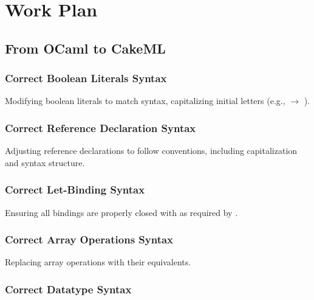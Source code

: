 
%

\chapter{Work Plan}
\label{cha:Work_Plan}

\section{From OCaml to CakeML}

\subsection{Correct Boolean Literals Syntax}

Modifying boolean literals to match \cml syntax, capitalizing initial letters (e.g.,  
$\rightarrow$ ).

\subsection{Correct Reference Declaration Syntax}

Adjusting reference declarations to follow \cml conventions, including capitalization and syntax structure.

\subsection{Correct Let-Binding Syntax}

Ensuring all  bindings are properly closed with  as required by \cml.

\subsection{Correct Array Operations Syntax}

Replacing \ocaml array operations with their \cml equivalents.

\subsection{Correct Datatype Syntax}


